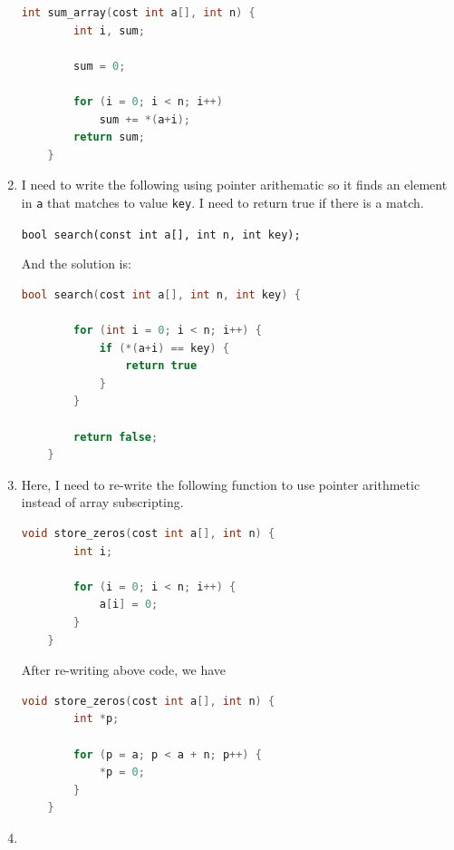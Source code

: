 \documentclass[12pt]{article}
\begin{document}
\begin{enumerate}[1.]
\begin{lstlisting}[language=c]
    int sum_array(cost int a[], int n) {
        int i, sum;

        sum = 0;

        for (i = 0; i < n; i++)
            sum += *(a+i);
        return sum;
    }
\end{lstlisting}

    \item

    I need to write the following using pointer arithematic so it finds an element
    in \texttt{a} that matches to value \texttt{key}. I need to return
    true if there is a match.

    \bigskip

    \texttt{bool search(const int a[], int n, int key);}

    \bigskip

    And the solution is:

\begin{lstlisting}[language=c]
    bool search(cost int a[], int n, int key) {

        for (int i = 0; i < n; i++) {
            if (*(a+i) == key) {
                return true
            }
        }

        return false;
    }
\end{lstlisting}

    \item

    Here, I need to re-write the following function to use pointer arithmetic
    instead of array subscripting.

    \bigskip

\begin{lstlisting}[language=c]
    void store_zeros(cost int a[], int n) {
        int i;

        for (i = 0; i < n; i++) {
            a[i] = 0;
        }
    }
\end{lstlisting}

    \bigskip

    After re-writing above code, we have

\begin{lstlisting}[language=c]
    void store_zeros(cost int a[], int n) {
        int *p;

        for (p = a; p < a + n; p++) {
            *p = 0;
        }
    }
\end{lstlisting}

    \item


\end{enumerate}
\end{document}
